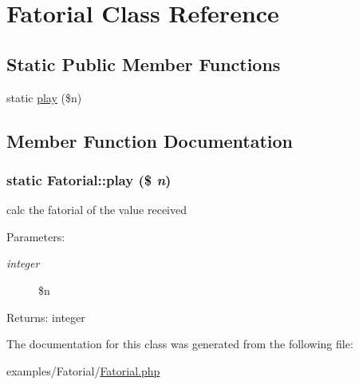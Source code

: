 \hypertarget{class_fatorial}{
\section{Fatorial Class Reference}
\label{class_fatorial}
}
\subsection*{Static Public Member Functions}
\begin{CompactItemize}
\item 
static \hyperlink{class_fatorial_72d167f440f3d1ac6d5d241195ea245c}{play} (\$n)
\end{CompactItemize}


\subsection{Member Function Documentation}
\hypertarget{class_fatorial_72d167f440f3d1ac6d5d241195ea245c}{
\subsubsection[{play}]{\setlength{\rightskip}{0pt plus 5cm}static Fatorial::play (\$ {\em n})}}
\label{class_fatorial_72d167f440f3d1ac6d5d241195ea245c}


calc the fatorial of the value received

\begin{Desc}
\item[Parameters:]
\begin{description}
\item[{\em integer}]\$n \end{description}
\end{Desc}
\begin{Desc}
\item[Returns:]integer \end{Desc}


The documentation for this class was generated from the following file:\begin{CompactItemize}
\item 
examples/Fatorial/\hyperlink{_fatorial_8php}{Fatorial.php}\end{CompactItemize}
